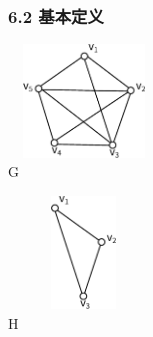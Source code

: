 \documentclass{beamer}
\begin{document}
\begin{CJK*}{UTF8}{gbsn}
\begin{frame}
  \frametitle{6.2 基本定义}
    \begin{minipage}[c]{0.4\textwidth}
\includegraphics[width=4cm,height=3cm]{subgraph1} \\ \centering G 
    \end{minipage}\hspace{2cm}
    \begin{minipage}[c]{0.4\textwidth}
\includegraphics[width=4cm,height=3cm]{induced} \\ \centering H 
    \end{minipage}


\end{frame}
\end{CJK*}
\end{document}
